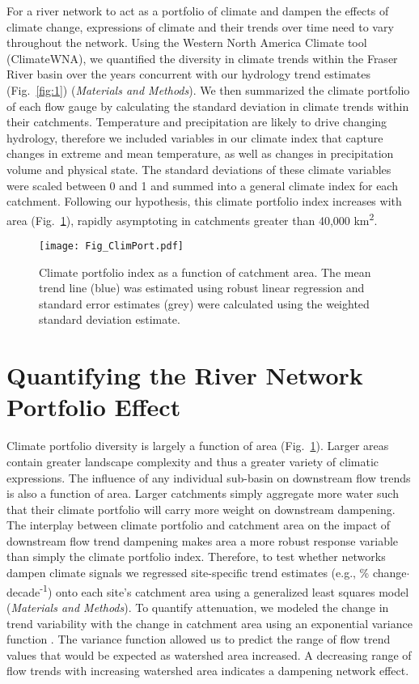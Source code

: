 \documentclass[9pt,twocolumn,twoside,lineno]{pnas-new}
\begin{document}
For a river network to act as a portfolio of climate and dampen the effects of climate change, expressions of climate and their trends over time need to vary throughout the network. Using the Western North America Climate tool (ClimateWNA), we quantified the diversity in climate trends within the Fraser River basin over the years concurrent with our hydrology trend estimates \citep{Wang:2016} (Fig.~\ref{fig:1}) (\textit{Materials and Methods}). We then summarized the climate portfolio of each flow gauge by calculating the standard deviation in climate trends within their catchments. Temperature and precipitation are likely to drive changing hydrology, therefore we included variables in our climate index that capture changes in extreme and mean temperature, as well as changes in precipitation volume and physical state. The standard deviations of these climate variables were scaled between 0 and 1 and summed into a general climate index for each catchment. Following our hypothesis, this climate portfolio index increases with area (Fig.~\ref{fig:2}), rapidly asymptoting in catchments greater than 40,000 km\textsuperscript{2}.

\begin{figure}%
\centering
\texttt{[image: Fig\_ClimPort.pdf]}
	\caption{Climate portfolio index as a function of catchment area. The mean trend line (blue) was estimated using robust linear regression and standard error estimates (grey) were calculated using the weighted standard deviation estimate.}
\label{fig:2}
\end{figure}

\section*{Quantifying the River Network Portfolio Effect}
Climate portfolio diversity is largely a function of area (Fig.~\ref{fig:2}). Larger areas contain greater landscape complexity and thus a greater variety of climatic expressions. The influence of any individual sub-basin on downstream flow trends is also a function of area. Larger catchments simply aggregate more water such that their climate portfolio will carry more weight on downstream dampening. The interplay between climate portfolio and catchment area on the impact of downstream flow trend dampening makes area a more robust response variable than simply the climate portfolio index. Therefore, to test whether networks dampen climate signals we regressed site-specific trend estimates (e.g., \% change$\cdot$decade\textsuperscript{-1}) onto each site's catchment area using a generalized least squares model (\textit{Materials and Methods}). To quantify attenuation, we modeled the change in trend variability with the change in catchment area using an exponential variance function \citep{Pinheiro:2006}. The variance function allowed us to predict the range of flow trend values that would be expected as watershed area increased. A decreasing range of flow trends with increasing watershed area indicates a dampening network effect.
\end{document}
